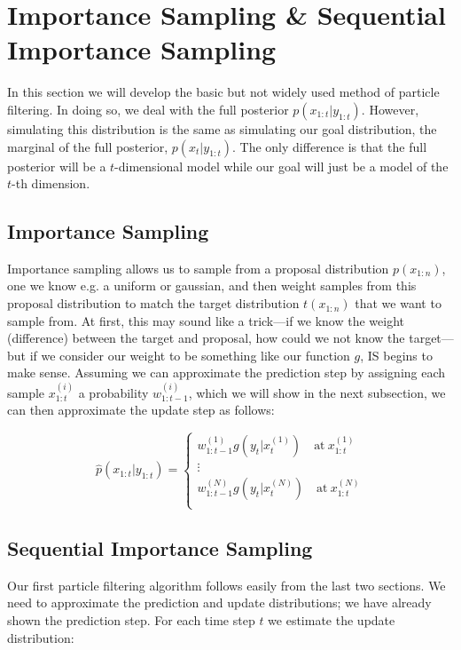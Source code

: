 \documentclass{article}
\begin{document}


\section{Importance Sampling \& Sequential Importance Sampling}
In this section we will develop the basic but not widely used method of particle filtering. In doing so, we deal with the full posterior $p(x_{1:t}|y_{1:t})$. However, simulating this distribution is the same as simulating our goal distribution, the marginal of the full posterior, $p(x_t|y_{1:t})$. The only difference is that the full posterior will be a $t$-dimensional model while our goal will just be a model of the $t$-th dimension.

\subsection{Importance Sampling}
Importance sampling allows us to sample from a proposal distribution $p(x_{1:n})$, one we know e.g. a uniform or gaussian, and then weight samples from this proposal distribution to match the target distribution $t(x_{1:n})$ that we want to sample from. At first, this may sound like a trick---if we know the weight (difference) between the target and proposal, how could we not know the target---but if we consider our weight to be something like our function $g$, IS begins to make sense. Assuming we can approximate the prediction step by assigning each sample $x_{1:t}^{(i)}$ a probability $w_{1:t-1}^{(i)}$, which we will show in the next subsection, we can then approximate the update step as follows:

\begin{equation}
\widehat{p}(x_{1:t}|y_{1:t}) = \begin{cases}
w_{1:t-1}^{(1)}g(y_t|x_{t}^{(1)}) \quad \text{at} \ x_{1:t}^{(1)} \\
\vdots \\
w_{1:t-1}^{(N)}g(y_t|x_{t}^{(N)}) \quad \text{at} \ x_{1:t}^{(N)} \\
\end{cases}
\end{equation}

\subsection{Sequential Importance Sampling}
Our first particle filtering algorithm follows easily from the last two sections. We need to approximate the prediction and update distributions; we have already shown the prediction step. For each time step $t$ we estimate the update distribution:
\end{document}
